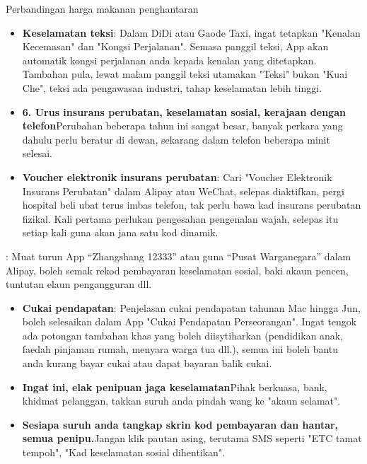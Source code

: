 Perbandingan harga makanan penghantaran


\begin{itemize}
  \item \textbf{Keselamatan teksi}: Dalam DiDi atau Gaode Taxi, ingat tetapkan "Kenalan Kecemasan" dan "Kongsi Perjalanan". Semasa panggil teksi, App akan automatik kongsi perjalanan anda kepada kenalan yang ditetapkan. Tambahan pula, lewat malam panggil teksi utamakan "Teksi" bukan "Kuai Che", teksi ada pengawasan industri, tahap keselamatan lebih tinggi.
  \item \textbf{6. Urus insurans perubatan, keselamatan sosial, kerajaan dengan telefon}Perubahan beberapa tahun ini sangat besar, banyak perkara yang dahulu perlu beratur di dewan, sekarang dalam telefon beberapa minit selesai.
  \item \textbf{Voucher elektronik insurans perubatan}: Cari "Voucher Elektronik Insurans Perubatan" dalam Alipay atau WeChat, selepas diaktifkan, pergi hospital beli ubat terus imbas telefon, tak perlu bawa kad insurans perubatan fizikal. Kali pertama perlukan pengesahan pengenalan wajah, selepas itu setiap kali guna akan jana satu kod dinamik.
\end{itemize}


: Muat turun App “Zhangshang 12333” atau guna “Pusat Warganegara” dalam Alipay, boleh semak rekod pembayaran keselamatan sosial, baki akaun pencen, tuntutan elaun pengangguran dll.

\begin{itemize}
  \item \textbf{Cukai pendapatan}: Penjelasan cukai pendapatan tahunan Mac hingga Jun, boleh selesaikan dalam App "Cukai Pendapatan Perseorangan". Ingat tengok ada potongan tambahan khas yang boleh diisytiharkan (pendidikan anak, faedah pinjaman rumah, menyara warga tua dll.), semua ini boleh bantu anda kurang bayar cukai atau dapat bayaran balik cukai.
  \item \textbf{Ingat ini, elak penipuan jaga keselamatan}Pihak berkuasa, bank, khidmat pelanggan, takkan suruh anda pindah wang ke "akaun selamat".
  \item \textbf{Sesiapa suruh anda tangkap skrin kod pembayaran dan hantar, semua penipu.}Jangan klik pautan asing, terutama SMS seperti "ETC tamat tempoh", "Kad keselamatan sosial dihentikan".
\end{itemize}

